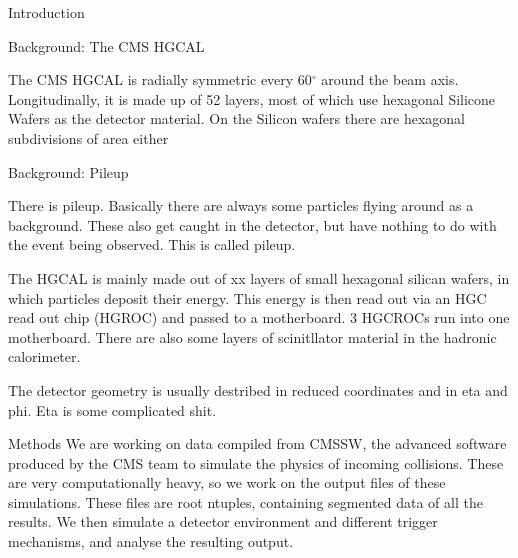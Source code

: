 \documentclass[final,hyperref={pdfpagelabels=false}]{beamer}
\begin{document}
\begin{frame}[t]
\begin{columns}[t]
\begin{column}{.465\textwidth}
\begin{block}{Introduction}
\end{block}

            
\begin{block}{Background: The CMS HGCAL}

	The CMS HGCAL is radially symmetric every 60$^\circ$ around the beam axis. Longitudinally, it is made up of 52 layers, most of which use hexagonal Silicone Wafers as the detector material. On the Silicon wafers there are hexagonal subdivisions of area either 

\end{block}

\begin{block}{Background: Pileup}



	There is pileup. Basically there are always some particles flying around as a background. These also get caught in the detector, but have nothing to do with the event being observed. This is called pileup.

	The HGCAL is mainly made out of xx layers of small hexagonal silican wafers, in which particles deposit their energy. This energy is then read out via an HGC read out chip (HGROC) and passed to a motherboard. 3 HGCROCs run into one motherboard. There are also some layers of scinitllator material in the hadronic calorimeter. 

	The detector geometry is usually destribed in reduced coordinates and in eta and phi. Eta is some complicated shit. 
\end{block}



\begin{block}{Methods}
	We are working on data compiled from CMSSW, the advanced software produced by the CMS team to simulate the physics of incoming collisions. These are very computationally heavy, so we work on the output files of these simulations. These files are root ntuples, containing segmented data of all the results. We then simulate a detector environment and different trigger mechanisms, and analyse the resulting output. 


\end{block}
\end{column}
\end{columns}
\end{frame}
\end{document}
